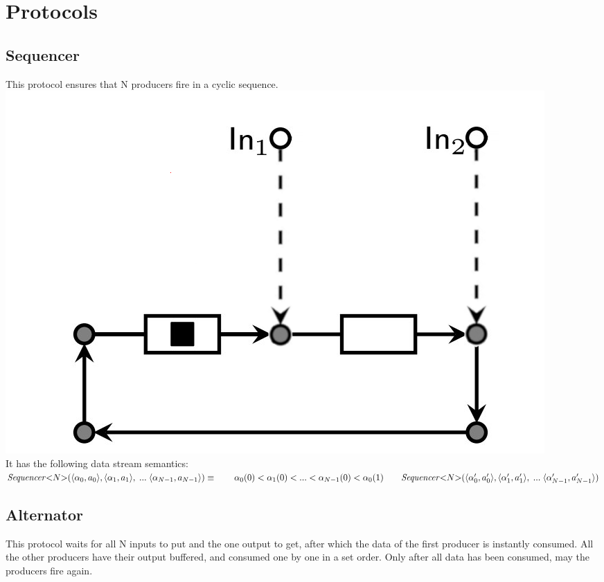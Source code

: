 \section{Protocols}
\subsection{Sequencer}
This protocol ensures that N producers fire in a cyclic sequence.\\

\includegraphics[]{img/seq.png}\\
%
It has the following data stream semantics:\\
%
$
\vspace{0.2cm}\mathit{Sequencer}{<}N{>}(\langle \alpha_0, a_0 \rangle, \langle \alpha_1, a_1 \rangle,\;...\; \langle \alpha_{N-1}, a_{N-1} \rangle) \equiv \\
\vspace{0.2cm}\hphantom \qquad  \alpha_0(0) < \alpha_1(0) < ... < \alpha_{N-1}(0) < \alpha_0(1) \\
\hphantom \qquad \mathit{Sequencer}{<}N{>}(\langle \alpha_0', a_0' \rangle, \langle \alpha_1', a_1' \rangle,\;...\; \langle \alpha_{N-1}', a_{N-1}' \rangle)
$


\subsection{Alternator}
This protocol waits for all N inputs to put and the one output to get, after which the data of the first producer is instantly consumed.
All the other producers have their output buffered, and consumed one by one in a set order.
Only after all data has been consumed, may the producers fire again.\\

